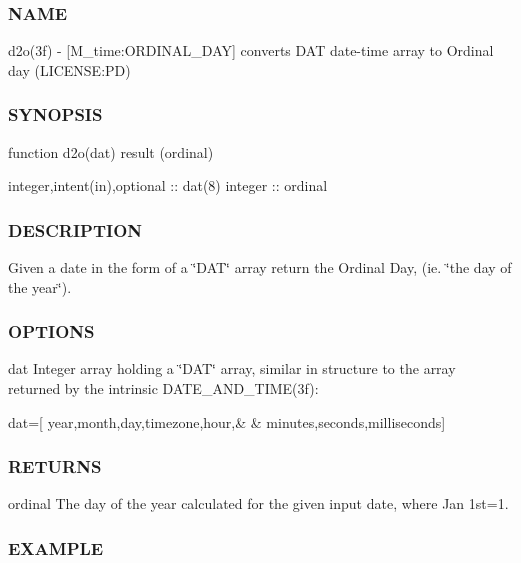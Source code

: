 \subsubsection*{N\+A\+ME}

d2o(3f) -\/ \mbox{[}M\+\_\+time\+:O\+R\+D\+I\+N\+A\+L\+\_\+\+D\+AY\mbox{]} converts D\+AT date-\/time array to Ordinal day (L\+I\+C\+E\+N\+SE\+:PD) 

\subsubsection*{S\+Y\+N\+O\+P\+S\+IS}

\begin{DoxyVerb}function d2o(dat) result (ordinal)

 integer,intent(in),optional :: dat(8)
 integer                     :: ordinal
\end{DoxyVerb}


\subsubsection*{D\+E\+S\+C\+R\+I\+P\+T\+I\+ON}

Given a date in the form of a \char`\"{}\+D\+A\+T\char`\"{} array return the Ordinal Day, (ie. \char`\"{}the day of the year\char`\"{}).

\subsubsection*{O\+P\+T\+I\+O\+NS}

dat Integer array holding a \char`\"{}\+D\+A\+T\char`\"{} array, similar in structure to the array returned by the intrinsic D\+A\+T\+E\+\_\+\+A\+N\+D\+\_\+\+T\+I\+M\+E(3f)\+: \begin{DoxyVerb}dat=[ year,month,day,timezone,hour,&
 & minutes,seconds,milliseconds]
\end{DoxyVerb}
 \subsubsection*{R\+E\+T\+U\+R\+NS}

ordinal The day of the year calculated for the given input date, where Jan 1st=1.

\subsubsection*{E\+X\+A\+M\+P\+LE}

